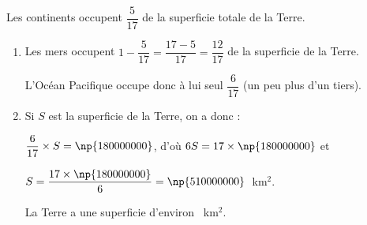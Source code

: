 
\medskip

Les continents occupent $\dfrac{5}{17}$ de la superficie totale de la Terre.


\medskip

\begin{enumerate}
\item %
Les mers occupent $1 - \dfrac{5}{17} = \dfrac{17 - 5}{17} = \dfrac{12}{17}$ de la superficie de la Terre.

L'Océan Pacifique occupe donc à lui seul $\dfrac{6}{17}$ (un peu plus d'un tiers).
\item %
Si $S$ est la superficie de la Terre, on a donc :

$\dfrac{6}{17}\times S = \np{180000000}$, d'où $6S = 17 \times \np{180000000}$ et 

$S = \dfrac{17 \times \np{180000000}}{6} = \np{510000000}$~km$^2$.

La Terre a une superficie d'environ ~km$^2$.
\end{enumerate}
